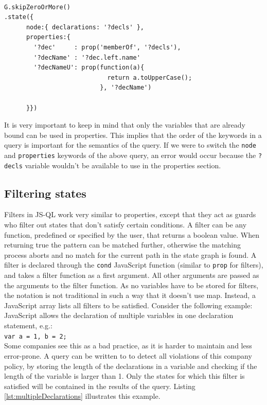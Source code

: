 \begin{lstlisting}[label={lst:propertiesExample},language=JSQL,caption=Specifying additional properties in JS-QL,mathescape=true]  % float=t?

G.skipZeroOrMore()
.state({
      node:{ declarations: '?decls' },
      properties:{
        '?dec'     : prop('memberOf', '?decls'),  
        '?decName' : '?dec.left.name'             
        '?decNameU': prop(function(a){            
                            return a.toUpperCase();
                          }, '?decName')
      
      }})
\end{lstlisting}

It is very important to keep in mind that only the variables that are already bound can be used in properties. This implies that the order of the keywords in a query is important for the semantics of the query. If we were to switch the \texttt{node} and \texttt{properties} keywords of the above query, an error would occur because the \texttt{?decls} variable wouldn't be available to use in the properties section.

\subsection{Filtering states}

Filters in JS-QL work very similar to properties, except that they act as guards who filter out states that don't satisfy certain conditions. A filter can be any function, predefined or specified by the user, that returns a boolean value. When returning true the pattern can be matched further, otherwise the matching process aborts and no match for the current path in the state graph is found. A filter is declared through the \texttt{cond} JavaScript function (similar to \texttt{prop} for filters), and takes a filter function as a first argument. All other arguments are passed as the arguments to the filter function. As no variables have to be stored for filters, the notation is not traditional in such a way that it doesn't use map. Instead, a JavaScript array lists all filters to be satisfied. Consider the following example: JavaScript allows the declaration of multiple variables in one declaration statement, e.g.:\\\texttt{var a = 1, b = 2;} \\Some companies see this as a bad practice, as it is harder to maintain and less error-prone. A query can be written to to detect all violations of this company policy, by storing the length of the declarations in a variable and checking if the length of the variable is larger than 1. Only the states for which this filter is satisfied will be contained in the results of the query. Listing \ref{lst:multipleDeclarations} illustrates this example.

